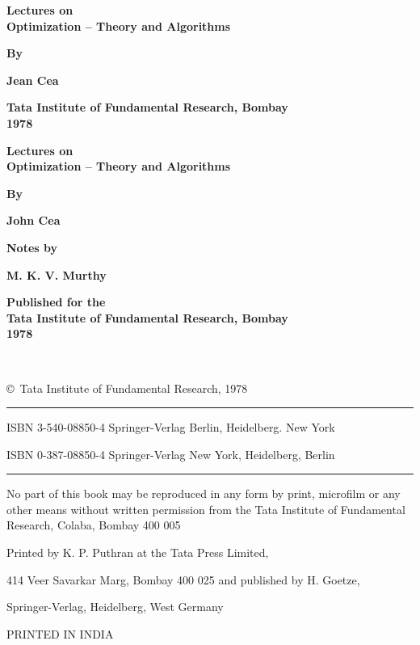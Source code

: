 \thispagestyle{empty}
\begin{center}
{\large\bf Lectures on}\\[5pt] 
{\Large\bf Optimization -- Theory and Algorithms}
\vfill

{\large\bf By}
\medskip

{\Large\bf Jean Cea}\\
\vfill

{\bf Tata Institute of Fundamental Research, Bombay}\\
{\bf 1978}

\end{center}

\eject

\thispagestyle{empty}
\begin{center}
{\large\bf Lectures on}\\ 
{\Large\bf Optimization -- Theory and Algorithms}
\vfill

{\large\bf By}
\medskip

{\Large\bf John Cea}\\
\vfill

{\large\bf Notes by}
\medskip

{\Large\bf M. K. V. Murthy}
\vfill


{\bf Published for the}\\[5pt]
{\bf Tata Institute of Fundamental Research, Bombay}\\
{\bf 1978}
\end{center}

\newpage

\thispagestyle{empty}
~\phantom{a}

\vskip 5cm

\begin{center}

\copyright\ Tata Institute of Fundamental Research, 1978

\vskip 1cm

\noindent
\rule{\textwidth}{1pt}

ISBN 3-540-08850-4 Springer-Verlag Berlin, Heidelberg. New York

ISBN 0-387-08850-4 Springer-Verlag New York, Heidelberg, Berlin

\noindent
\rule{\textwidth}{1pt}

\vfill

\parbox{0.7\textwidth}{No part of this book may be reproduced
in any form by print, microfilm or any other means without written permission
from the Tata Institute of Fundamental Research, Colaba, Bombay 400 005}
\vfill

Printed by K. P. Puthran at the Tata Press Limited,

414 Veer Savarkar Marg, Bombay 400 025 and published by H. Goetze,

Springer-Verlag, Heidelberg, West Germany

\medskip

PRINTED IN INDIA
\end{center}

\vfill
\eject

